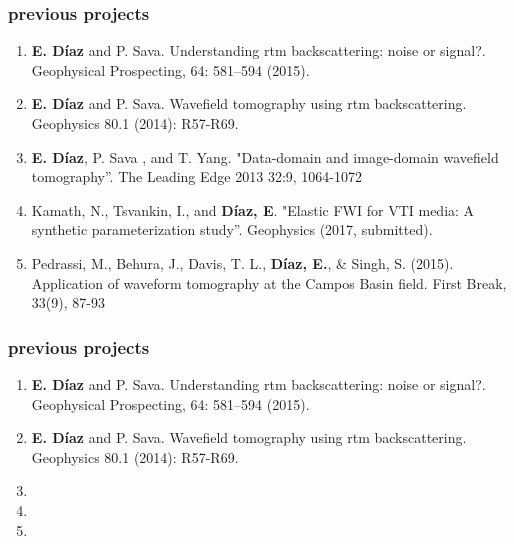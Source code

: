 \begin{frame}
\vspace{-2cm}
\end{frame}




\begin{frame} \frametitle{previous projects}
  \large
  \begin{enumerate}
    \item {\bf E. D\'{i}az} and P. Sava. Understanding rtm backscattering: noise or signal?. Geophysical Prospecting, 64: 581–594 (2015).
    \item {\bf E. D\'{i}az} and P. Sava. Wavefield tomography using rtm backscattering. Geophysics 80.1 (2014): R57-R69.
    \item {\bf E. D\'{i}az}, P. Sava , and T. Yang. "Data-domain and image-domain wavefield tomography”. The Leading Edge 2013 32:9, 1064-1072 
    \item  Kamath, N., Tsvankin, I., and {\bf D\'{i}az, E}. "Elastic FWI for VTI media: A synthetic parameterization study”. Geophysics (2017, submitted). 
    \item Pedrassi, M., Behura, J., Davis, T. L.,  {\bf D\'{i}az, E.}, \& Singh, S. (2015). Application of waveform tomography at the Campos Basin field. First Break, 33(9), 87-93
  \end{enumerate} 
\end{frame}


\begin{frame} \frametitle{previous projects}
  \large
  \begin{enumerate}
    \item {\bf E. D\'{i}az} and P. Sava. Understanding rtm backscattering: noise or signal?. Geophysical Prospecting, 64: 581–594 (2015).
    \item {\bf E. D\'{i}az} and P. Sava. Wavefield tomography using rtm backscattering. Geophysics 80.1 (2014): R57-R69.
    \item {}
    \item {} 
    \item {}
  \end{enumerate} 
\end{frame}


